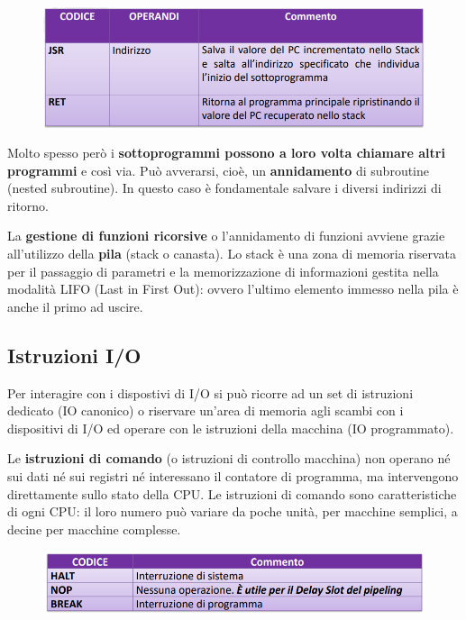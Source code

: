 \documentclass[12pt]{article}
\begin{document}
\begin{figure}[h]
    \centering
    \includegraphics[width=1\linewidth]{subroutine.png}
\end{figure}
\par\maketitle\noindent
Molto spesso però i \textbf{sottoprogrammi possono a loro volta chiamare altri programmi} e così via. Può avverarsi, cioè, un \textbf{annidamento} di subroutine (nested subroutine). In questo caso è fondamentale salvare i diversi indirizzi di ritorno.\par\medskip\noindent
La \textbf{gestione di funzioni ricorsive} o l’annidamento di funzioni avviene grazie all’utilizzo della \textbf{pila} (stack o canasta). Lo stack è una zona di memoria riservata per il passaggio di parametri e la memorizzazione di informazioni gestita nella modalità LIFO (Last in First Out): ovvero l’ultimo elemento immesso nella pila è anche il primo ad uscire.\\
\subsection{Istruzioni I/O}
Per interagire con i dispostivi di I/O si può ricorre ad un set di istruzioni dedicato (IO canonico) o riservare un’area di memoria agli scambi con i dispositivi di I/O ed operare con le istruzioni della macchina (IO programmato).\par\medskip\noindent
Le \textbf{istruzioni di comando} (o istruzioni di controllo macchina) non operano né sui dati né sui registri né interessano il contatore di programma, ma intervengono direttamente sullo stato della CPU. Le istruzioni di comando sono caratteristiche di ogni CPU: il loro numero può variare da poche unità, per macchine semplici, a decine per macchine complesse.
\begin{figure}[h]
    \centering
    \includegraphics[width=1\linewidth]{input o out.png}
\end{figure}
\end{document}
